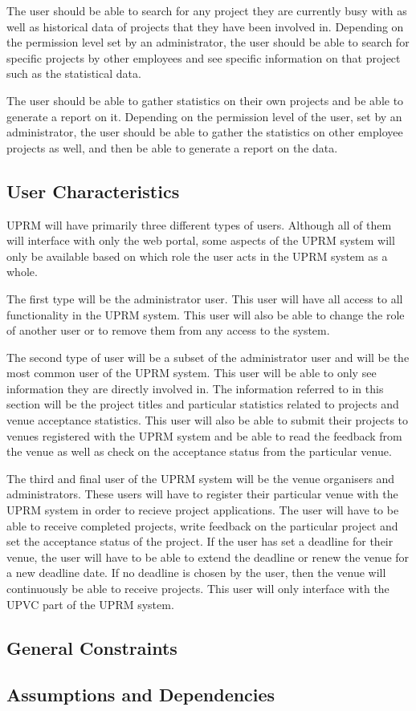 		The user should be able to search for any project they are currently busy with as well as historical data of projects that they have been involved in. Depending on the permission level set by an administrator, the user should be able to search for specific projects by other employees and see specific information on that project such as the statistical data.
		
		The user should be able to gather statistics on their own projects and be able to generate a report on it. Depending on the permission level of the user, set by an administrator, the user should be able to gather the statistics on other employee projects as well, and then be able to generate a report on the data.
	
	\subsection{User Characteristics}
		UPRM will have primarily three different types of users. Although all of them will interface with only the web portal, some aspects of the UPRM system will only be available based on which role the user acts in the UPRM system as a whole.
		
		The first type will be the administrator user. This user will have all access to all functionality in the UPRM system. This user will also be able to change the role of another user or to remove them from any access to the system.
		
		The second type of user will be a subset of the administrator user and will be the most common user of the UPRM system. This user will be able to only see information they are directly involved in. The information referred to in this section will be the project titles and particular statistics related to projects and venue acceptance statistics. This user will also be able to submit their projects to venues registered with the UPRM system and be able to read the feedback from the venue as well as check on the acceptance status from the particular venue.
		
		The third and final user of the UPRM system will be the venue organisers and administrators. These users will have to register their particular venue with the UPRM system in order to recieve project applications. The user will have to be able to receive completed projects, write feedback on the particular project and set the acceptance status of the project. If the user has set a deadline for their venue, the user will have to be able to extend the deadline or renew the venue for a new deadline date. If no deadline is chosen by the user, then the venue will continuously be able to receive projects. This user will only interface with the UPVC part of the UPRM system.
	
	\subsection{General Constraints}
	\subsection{Assumptions and Dependencies}